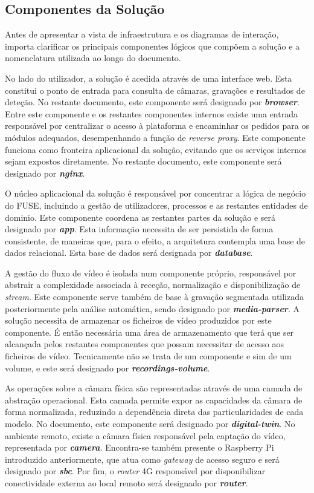 \subsection{Componentes da Solução}

Antes de apresentar a vista de infraestrutura e os diagramas de interação, importa clarificar os principais componentes lógicos que compõem a solução e a nomenclatura utilizada ao longo do documento. 

No lado do utilizador, a solução é acedida através de uma interface web. Esta constitui o ponto de entrada para consulta de câmaras, gravações e resultados de deteção. No restante documento, este componente será designado por \textbf{\textit{browser}}. Entre este componente e os restantes componentes internos existe uma entrada responsável por centralizar o acesso à plataforma e encaminhar os pedidos para os módulos adequados, desempenhando a função de \textit{reverse proxy}. Este componente funciona como fronteira aplicacional da solução, evitando que os serviços internos sejam expostos diretamente. No restante documento, este componente será designado por \textbf{\textit{nginx}}.

O núcleo aplicacional da solução é responsável por concentrar a lógica de negócio do \gls{FUSE}, incluindo a gestão de utilizadores, processos e as restantes entidades de dominio. Este componente coordena as restantes partes da solução e será designado por \textbf{\textit{app}}. Esta informação necessita de ser persistida de forma consistente, de maneiras que, para o efeito, a arquitetura contempla uma base de dados relacional. Esta base de dados será designada por \textbf{\textit{database}}.

A gestão do fluxo de vídeo é isolada num componente próprio, responsável por abstrair a complexidade associada à receção, normalização e disponibilização de \textit{stream}. Este componente serve também de base à gravação segmentada utilizada posteriormente pela análise automática, sendo designado por \textbf{\textit{media-parser}}. A solução necessita de armazenar os ficheiros de vídeo produzidos por este componente. É então necessária uma área de armazenamento que terá que ser alcançada pelos restantes componentes que possam necessitar de acesso aos ficheiros de vídeo. Tecnicamente não se trata de um componente e sim de um volume, e este será designado por \textbf{\textit{recordings-volume}}.

As operações sobre a câmara física são representadas através de uma camada de abstração operacional. Esta camada permite expor as capacidades da câmara de forma normalizada, reduzindo a dependência direta das particularidades de cada modelo. No documento, este componente será designado por \textbf{\textit{digital-twin}}.
No ambiente remoto, existe a câmara física responsável pela captação do vídeo, representada por \textbf{\textit{camera}}. Encontra-se também presente o Raspberry Pi introduzido anteriormente, que atua como \textit{gateway} de acesso seguro e será designado por \textbf{\textit{sbc}}. Por fim, o \textit{router} 4G responsável por disponibilizar conectividade externa ao local remoto será designado por \textbf{\textit{router}}.

